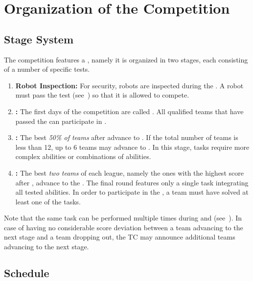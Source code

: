 \section{Organization of the Competition}
\label{sec:procedure_during_competition}

\subsection{Stage System}\label{rule:stages}

The competition features a , namely it is organized in two stages, each consisting of a number of specific tests.
\begin{enumerate}
	\item \textbf{Robot Inspection:} For security, robots are inspected during the \SetupDays.
	A robot must pass the \RobotInspection{} test (see~) so that it is allowed to compete.

	\item \textbf{\SONE:} The first days of the competition are called \SONE.
	All qualified teams that have passed the \RobotInspection{} can participate in \SONE.


	\item \textbf{\STWO:} The best \emph{50\% of teams} after \SONE{} advance to \STWO. If the total number of teams is less than 12, up to 6 teams may advance to \STWO.
	In this stage, tasks require more complex abilities or combinations of abilities.

	\item \textbf{\FINAL:} The best \emph{two teams} of each league, namely the ones with the highest score after \STWO, advance to the \FINAL.
	The final round features only a single task integrating all tested abilities.
	In order to participate in the \FINAL, a team must have solved at least one of the \STWO{} tasks.
\end{enumerate}
Note that the same task can be performed multiple times during \SONE{} and \STWO{} (see~).
In case of having no considerable score deviation between a team advancing to the next stage and a team dropping out, the TC may announce additional teams advancing to the next stage.


\subsection{Schedule}
\label{rule:schedule}

